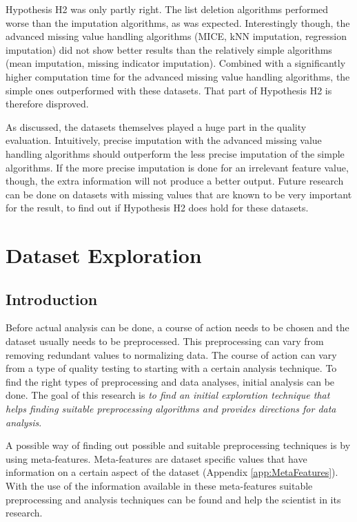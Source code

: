 \documentclass[10pt,a4paper]{report}
\begin{document}
	Hypothesis H2 was only partly right. The list deletion algorithms performed worse than the imputation algorithms, as was expected. Interestingly though, the advanced missing value handling algorithms (MICE, kNN imputation, regression imputation) did not show better results than the relatively simple algorithms (mean imputation, missing indicator imputation). Combined with a significantly higher computation time for the advanced missing value handling algorithms, the simple ones outperformed with these datasets. That part of Hypothesis H2 is therefore disproved.  
	
	As discussed, the datasets themselves played a huge part in the quality evaluation. Intuitively, precise imputation with the advanced missing value handling algorithms should outperform the less precise imputation of the simple algorithms. If the more precise imputation is done for an irrelevant feature value, though, the extra information will not produce a better output. Future research can be done on datasets with missing values that are known to be very important for the result, to find out if Hypothesis H2 does hold for these datasets.
	
	\chapter{Dataset Exploration}
	\label{chap:DatasetExploration}
	
	\section{Introduction}
	\label{DEsec:Introduction}
	
	Before actual analysis can be done, a course of action needs to be chosen and the dataset usually needs to be preprocessed. This preprocessing can vary from removing redundant values to normalizing data. The course of action can vary from a type of quality testing to starting with a certain analysis technique. To find the right types of preprocessing and data analyses, initial analysis can be done. The goal of this research is \emph{to find an initial exploration technique that helps finding suitable preprocessing algorithms and provides directions for data analysis}.
	
	A possible way of finding out possible and suitable preprocessing techniques is by using meta-features. Meta-features are dataset specific values that have information on a certain aspect of the dataset \cite{kluegl2009meta} (Appendix \ref{app:MetaFeatures}). With the use of the information available in these meta-features suitable preprocessing and analysis techniques can be found and help the scientist in its research.
	
\end{document}
